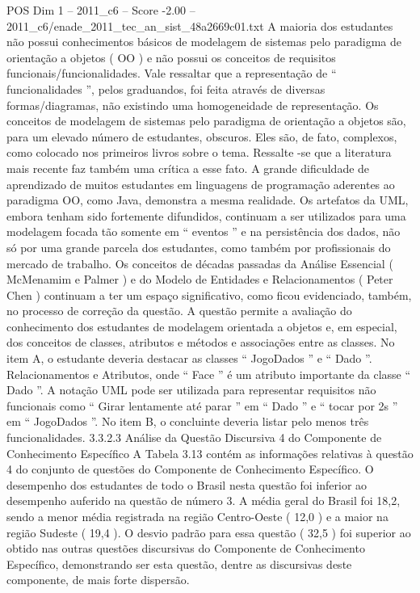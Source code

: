 \begin{textsample}{POS Dim 1 – 2011\_c6 – Score -2.00 – 2011\_c6/enade\_2011\_tec\_an\_sist\_48a2669c01.txt}
A maioria dos estudantes não possui conhecimentos básicos de modelagem de sistemas pelo paradigma de orientação a objetos ( OO ) e não possui os conceitos de requisitos funcionais/funcionalidades.
Vale ressaltar que a representação de “ funcionalidades ”, pelos graduandos, foi feita através de diversas formas/diagramas, não existindo uma homogeneidade de representação.
Os conceitos de modelagem de sistemas pelo paradigma de orientação a objetos são, para um elevado número de estudantes, obscuros.
Eles são, de fato, complexos, como colocado nos primeiros livros sobre o tema.
Ressalte -se que a literatura mais recente faz também uma crítica a esse fato.
A grande dificuldade de aprendizado de muitos estudantes em linguagens de programação aderentes ao paradigma OO, como Java, demonstra a mesma realidade.
Os artefatos da UML, embora tenham sido fortemente difundidos, continuam a ser utilizados para uma modelagem focada tão somente em “ eventos ” e na persistência dos dados, não só por uma grande parcela dos estudantes, como também por profissionais do mercado de trabalho.
Os conceitos de décadas passadas da Análise Essencial ( McMenamim e Palmer ) e do Modelo de Entidades e Relacionamentos ( Peter Chen ) continuam a ter um espaço significativo, como ficou evidenciado, também, no processo de correção da questão.
A questão permite a avaliação do conhecimento dos estudantes de modelagem orientada a objetos e, em especial, dos conceitos de classes, atributos e métodos e associações entre as classes.
No item A, o estudante deveria destacar as classes “ JogoDados ” e “ Dado ”.
Relacionamentos e Atributos, onde “ Face ” é um atributo importante da classe “ Dado ”.
A notação UML pode ser utilizada para representar requisitos não funcionais como “ Girar lentamente até parar ” em “ Dado ” e “ tocar por 2s ” em “ JogoDados ”.
No item B, o concluinte deveria listar pelo menos três funcionalidades. 3.3.2.3 Análise da Questão Discursiva 4 do Componente de Conhecimento Específico A Tabela 3.13 contém as informações relativas à questão 4 do conjunto de questões do Componente de Conhecimento Específico.
O desempenho dos estudantes de todo o Brasil nesta questão foi inferior ao desempenho auferido na questão de número 3.
A média geral do Brasil foi 18,2, sendo a menor média registrada na região Centro-Oeste ( 12,0 ) e a maior na região Sudeste ( 19,4 ).
O desvio padrão para essa questão ( 32,5 ) foi superior ao obtido nas outras questões discursivas do Componente de Conhecimento Específico, demonstrando ser esta questão, dentre as discursivas deste componente, de mais forte dispersão.

\end{textsample}
